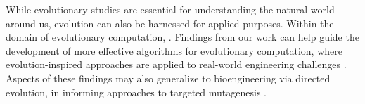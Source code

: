 While evolutionary studies are essential for understanding the natural world around us, evolution can also be harnessed for applied purposes.
Within the domain of evolutionary computation, .
Findings from our work can help guide the development of more effective algorithms for evolutionary computation, where evolution-inspired approaches are applied to real-world engineering challenges \citep{holland1992genetic}.
Aspects of these findings may also generalize to bioengineering via directed evolution, in informing approaches to targeted mutagenesis \citep{sandberg2019emergence}.

